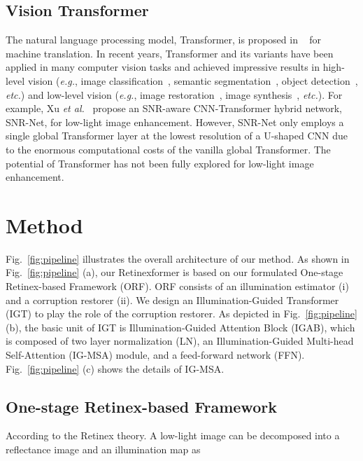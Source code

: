 \documentclass[10pt,twocolumn,letterpaper]{article}
\begin{document}
\subsection{Vision Transformer}
\vspace{-0.9mm}
The natural language processing model, Transformer, is proposed in ~\cite{vaswani2017attention} for machine translation. In recent years, Transformer and its variants have been applied in many computer vision tasks and achieved impressive results in high-level vision (\emph{e.g.}, image classification~\cite{xcit,arnab2021vivit,global_msa}, semantic segmentation~\cite{cao2021swin,tc_3,SETR}, object detection~\cite{to_1,dy_detr,DETR}, \emph{etc.}) and low-level vision (\emph{e.g.}, image restoration~\cite{dauhst,ipt,restormer}, image synthesis~\cite{gat,transgan,styleswin}, \emph{etc.}). For example, Xu \emph{et al.}~\cite{snr_net} propose an SNR-aware CNN-Transformer hybrid network, SNR-Net, for low-light image enhancement. However, SNR-Net only employs a single  global Transformer layer at the lowest resolution of a U-shaped CNN due to the enormous computational costs of the vanilla global Transformer. The potential of Transformer has not been fully explored for low-light image enhancement.

\vspace{-1.2mm}
\section{Method}
\vspace{-0.8mm}
Fig.~\ref{fig:pipeline} illustrates the overall architecture of our method. As shown in Fig.~\ref{fig:pipeline} (a), our Retinexformer is based on our formulated One-stage Retinex-based Framework (ORF). ORF consists of an illumination estimator (i) and a corruption restorer (ii). We design an Illumination-Guided Transformer (IGT) to play the role of the corruption restorer. As depicted in Fig.~\ref{fig:pipeline} (b), the basic unit of IGT is Illumination-Guided Attention Block (IGAB), which is composed of two layer normalization (LN), an Illumination-Guided Multi-head Self-Attention (IG-MSA) module, and a feed-forward network (FFN). Fig.~\ref{fig:pipeline} (c) shows the details of IG-MSA.

\vspace{-0.5mm}
\subsection{One-stage Retinex-based Framework}
\vspace{-1mm}
\label{orf}
According to  the Retinex theory. A low-light image  can be decomposed into a reflectance image   and an illumination map   as
\vspace{-2.2mm}
\end{document}
